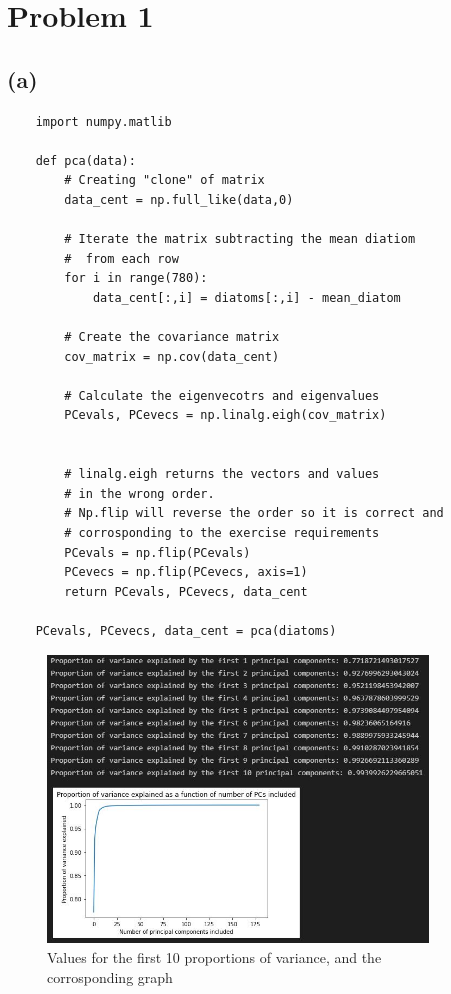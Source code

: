 \section{Problem 1}
\subsection{(a)}

\begin{verbatim}
    import numpy.matlib

    def pca(data):
        # Creating "clone" of matrix
        data_cent = np.full_like(data,0) 

        # Iterate the matrix subtracting the mean diatiom
        #  from each row
        for i in range(780):
            data_cent[:,i] = diatoms[:,i] - mean_diatom

        # Create the covariance matrix
        cov_matrix = np.cov(data_cent)

        # Calculate the eigenvecotrs and eigenvalues
        PCevals, PCevecs = np.linalg.eigh(cov_matrix)
        
        
        # linalg.eigh returns the vectors and values 
        # in the wrong order.
        # Np.flip will reverse the order so it is correct and
        # corrosponding to the exercise requirements
        PCevals = np.flip(PCevals)
        PCevecs = np.flip(PCevecs, axis=1)
        return PCevals, PCevecs, data_cent

    PCevals, PCevecs, data_cent = pca(diatoms)
\end{verbatim}

\begin{figure}[H]
    \centering
    \includegraphics[width=0.9\textwidth]{Figures/Proportion_of_variance.JPG}
    \caption{Values for the first 10 proportions of variance, and the corrosponding graph}
\end{figure}




